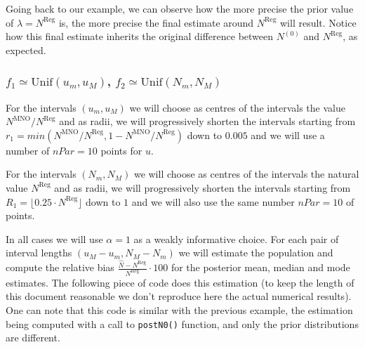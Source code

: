 \documentclass[12pt, a4paper]{article}
\begin{document}
Going back to our example, we can observe how the more precise the prior value of $\lambda = N^{\textrm{Reg}}$ is, 
the more precise  the final estimate around $N^{\textrm{Reg}}$ will result. 
Notice how this final estimate inherits the original difference between $N^{(0)}$ and $N^{\textrm{Reg}}$, as expected.


\subsubsection{$f_{1}\simeq\textrm{Unif}(u_{m}, u_{M})$, $f_{2}\simeq\textrm{Unif}(N_{m}, N_{M})$}

For the intervals $(u_{m}, u_{M})$ we will choose as centres of the intervals the value $N^{\textrm{MNO}} / N^{\textrm{Reg}}$ and as radii, 
we will progressively shorten the intervals starting from 
$r_{1}=min(N^{\textrm{MNO}} / N^{\textrm{Reg}}, 1- N^{\textrm{MNO}} / N^{\textrm{Reg}})$ down to $0.005$ and we will
use a number of $nPar=10$ points for $u$.

For the intervals $(N_{m}, N_{M})$ we will choose as centres of the intervals the 
natural value $N^{\textrm{Reg}}$ and as radii, we will progressively shorten the intervals starting from 
$R_{1}=\lfloor 0.25\cdot N^{\textrm{Reg}}\rfloor$ down to $1$ and we will also use the same number $nPar=10$ of points.

In all cases we will use $\alpha = 1$ as a weakly informative choice. For each pair of 
interval lengths $(u_{M}-u_{m}, N_{M} - N_{m})$ we will estimate the population and compute the relative
bias $\frac{\hat{N}-N^{\textrm{Reg}}}{N^{\textrm{Reg}}} \cdot 100$ for 
the posterior mean, median and mode estimates. The following piece of code does this estimation (to keep
the length of this document reasonable we don't reproduce here the actual numerical results).
One can note that this code is similar with the previous example, the estimation being computed 
with a call to \texttt{postN0()} function, and only the prior distributions are different.
\end{document}
